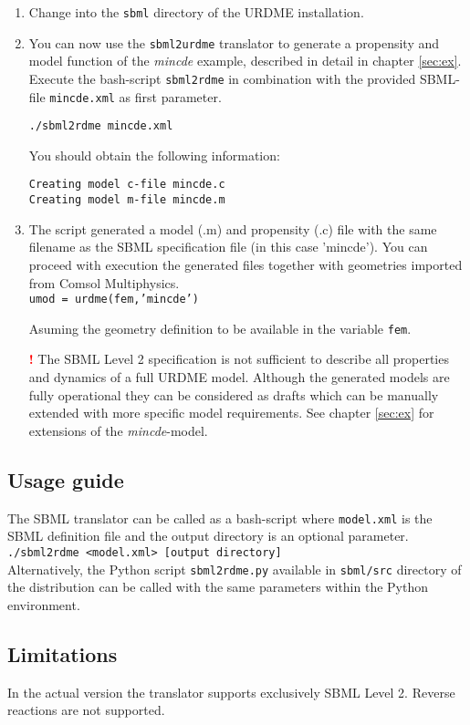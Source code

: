 \begin{enumerate}

\item Change into the \texttt{sbml} directory of the URDME installation. 

\item You can now use the \texttt{sbml2urdme} translator to generate a propensity and model function
of the \textit{mincde} example, described in detail in chapter \ref{sec:ex}.
Execute the bash-script \texttt{sbml2rdme} in combination with the provided SBML-file \texttt{mincde.xml} as first parameter.

\texttt{./sbml2rdme mincde.xml}

You should obtain the following information:

\texttt{Creating model c-file mincde.c} \\
\texttt{Creating model m-file mincde.m}

\item The script generated a model (.m) and propensity (.c) file with the same filename as the
SBML specification file (in this case 'mincde'). You can proceed with execution the generated files
together with geometries imported from Comsol Multiphysics. \\
\texttt{umod = urdme(fem,'mincde')}

Asuming the geometry definition to be available in the variable \texttt{fem}.

  \smallskip 
   
  {\bf \textcolor{red}{!}} The SBML Level 2 specification is not sufficient to describe all properties and dynamics
  of a full URDME model. Although the generated models are fully operational they can be considered
  as drafts which can be manually extended with more specific model requirements. See chapter \ref{sec:ex} for extensions
  of the \textit{mincde}-model.

\end{enumerate}

\subsection{Usage guide}
The SBML translator can be called as a bash-script where \texttt{model.xml} is the SBML definition file and the 
output directory is an optional parameter. \\

\texttt{./sbml2rdme <model.xml> [output directory]} \\

Alternatively, the Python script \texttt{sbml2rdme.py} available in  \texttt{sbml/src} directory of the distribution
can be called with the same parameters within the Python environment.

\subsection{Limitations}
In the actual version the translator supports exclusively SBML Level 2. Reverse reactions are not supported.

